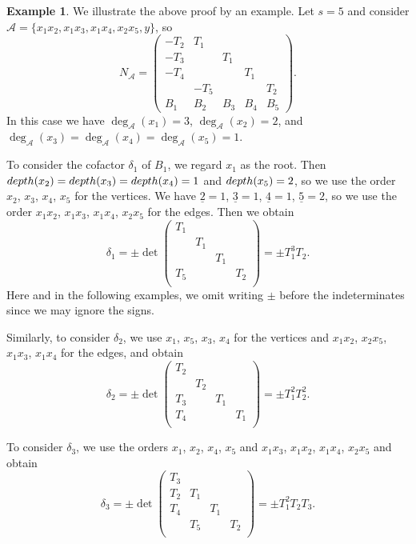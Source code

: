 \documentclass[11pt]{article}
\theoremstyle{definition}
\newtheorem{exam}[theo]{Example}
\numberwithin{equation}{section}
\newcommand{\cA}{\mathcal{A}}
\newcommand{\ul}[1]{\underline{#1}}
\newcommand{\depth}{{\rm depth}}
\begin{document}
\begin{exam}
We illustrate the above proof by an example.
Let $s = 5$ and consider $\cA = \{x_1 x_2, x_1 x_3, x_1 x_4, x_2 x_5, y\}$, so
\[
N_{\cA}
= \begin{pmatrix}
	-T_2 & T_1 & & &\\
	-T_3 & & T_1 & &\\
	-T_4 & & & T_1 &\\
	& -T_5 & & & T_2\\
	B_1 & B_2 & B_3 & B_4 & B_5	
\end{pmatrix}.
\]
In this case we have $\deg_{\cA}(x_1) = 3$, $\deg_{\cA}(x_2) = 2$, and $\deg_{\cA}(x_3) = \deg_{\cA}(x_4) = \deg_{\cA}(x_5) = 1$.

To consider the cofactor $\delta_1$ of $B_1$, we regard $x_1$ as the root.
Then $\depth(x_2) = \depth(x_3) = \depth(x_4) = 1$ and $\depth(x_5) = 2$, so we use the order $x_2$, $x_3$, $x_4$, $x_5$ for the vertices.
We have $\ul{2} = 1$, $\ul{3} = 1$, $\ul{4} = 1$, $\ul{5} = 2$, so we use the order $x_1 x_2$, $x_1 x_3$, $x_1 x_4$, $x_2 x_5$ for the edges.
Then we obtain
\[
\delta_1 = \pm \det 
\begin{pmatrix}
	T_1 & & &\\
	& T_1 & &\\
	& & T_1 &\\
	T_5 & & & T_2\\
\end{pmatrix}
= \pm T_1^3 T_2.
\]
Here and in the following examples, we omit writing $\pm$ before the indeterminates since we may ignore the signs.

Similarly, to consider $\delta_2$, we use $x_1$, $x_5$, $x_3$, $x_4$ for the vertices and $x_1 x_2$, $x_2 x_5$, $x_1 x_3$, $x_1 x_4$ for the edges, and obtain
\[
\delta_2 = \pm \det 
\begin{pmatrix}
	T_2 & & &\\
	& T_2 & &\\
	T_3 & & T_1 &\\
	T_4 & & & T_1\\
\end{pmatrix}
= \pm T_1^2 T_2^2.
\]

To consider $\delta_3$, we use the orders $x_1$, $x_2$, $x_4$, $x_5$ and $x_1 x_3$, $x_1 x_2$, $x_1 x_4$, $x_2 x_5$ and obtain
\[
\delta_3 = \pm \det 
\begin{pmatrix}
	T_3 & & &\\
	T_2 & T_1 & &\\
	T_4 & & T_1 &\\
	& T_5 & & T_2\\
\end{pmatrix}
= \pm T_1^2 T_2 T_3.
\]
\end{exam}
\end{document}
